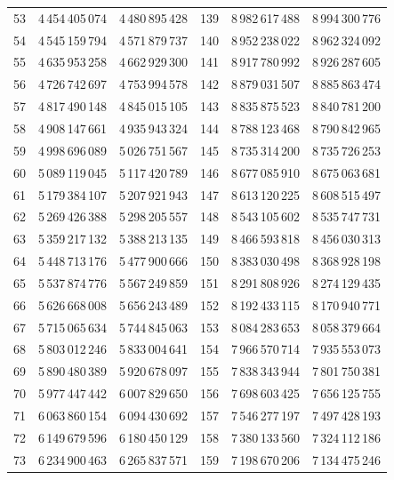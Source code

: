 \begin{longtable}{@{}r r r@{\qquad\qquad}r r r@{}}
53 & 4\,454\,405\,074 & 4\,480\,895\,428 & 139 & 8\,982\,617\,488 & 8\,994\,300\,776\\
54 & 4\,545\,159\,794 & 4\,571\,879\,737 & 140 & 8\,952\,238\,022 & 8\,962\,324\,092\\
55 & 4\,635\,953\,258 & 4\,662\,929\,300 & 141 & 8\,917\,780\,992 & 8\,926\,287\,605\\
56 & 4\,726\,742\,697 & 4\,753\,994\,578 & 142 & 8\,879\,031\,507 & 8\,885\,863\,474\\
57 & 4\,817\,490\,148 & 4\,845\,015\,105 & 143 & 8\,835\,875\,523 & 8\,840\,781\,200\\
58 & 4\,908\,147\,661 & 4\,935\,943\,324 & 144 & 8\,788\,123\,468 & 8\,790\,842\,965\\
59 & 4\,998\,696\,089 & 5\,026\,751\,567 & 145 & 8\,735\,314\,200 & 8\,735\,726\,253\\
60 & 5\,089\,119\,045 & 5\,117\,420\,789 & 146 & 8\,677\,085\,910 & 8\,675\,063\,681\\
61 & 5\,179\,384\,107 & 5\,207\,921\,943 & 147 & 8\,613\,120\,225 & 8\,608\,515\,497\\
62 & 5\,269\,426\,388 & 5\,298\,205\,557 & 148 & 8\,543\,105\,602 & 8\,535\,747\,731\\
63 & 5\,359\,217\,132 & 5\,388\,213\,135 & 149 & 8\,466\,593\,818 & 8\,456\,030\,313\\
64 & 5\,448\,713\,176 & 5\,477\,900\,666 & 150 & 8\,383\,030\,498 & 8\,368\,928\,198\\
65 & 5\,537\,874\,776 & 5\,567\,249\,859 & 151 & 8\,291\,808\,926 & 8\,274\,129\,435\\
66 & 5\,626\,668\,008 & 5\,656\,243\,489 & 152 & 8\,192\,433\,115 & 8\,170\,940\,771\\
67 & 5\,715\,065\,634 & 5\,744\,845\,063 & 153 & 8\,084\,283\,653 & 8\,058\,379\,664\\
68 & 5\,803\,012\,246 & 5\,833\,004\,641 & 154 & 7\,966\,570\,714 & 7\,935\,553\,073\\
69 & 5\,890\,480\,389 & 5\,920\,678\,097 & 155 & 7\,838\,343\,944 & 7\,801\,750\,381\\
70 & 5\,977\,447\,442 & 6\,007\,829\,650 & 156 & 7\,698\,603\,425 & 7\,656\,125\,755\\
71 & 6\,063\,860\,154 & 6\,094\,430\,692 & 157 & 7\,546\,277\,197 & 7\,497\,428\,193\\
72 & 6\,149\,679\,596 & 6\,180\,450\,129 & 158 & 7\,380\,133\,560 & 7\,324\,112\,186\\
73 & 6\,234\,900\,463 & 6\,265\,837\,571 & 159 & 7\,198\,670\,206 & 7\,134\,475\,246\\

\end{longtable}
